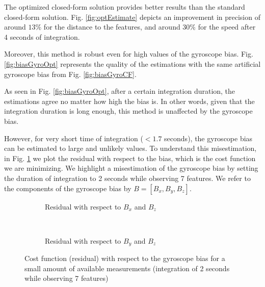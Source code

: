 \documentclass[letterpaper, 10 pt, conference]{ieeeconf}  %
\begin{document}
The optimized closed-form solution provides better results than the standard closed-form solution. Fig. \ref{fig:optEstimate} depicts an improvement in precision of around $13\%$ for the distance to the features, and around $30\%$ for the speed after 4 seconds of integration.



Moreover, this method is robust even for high values of the gyroscope bias.
Fig. \ref{fig:biasGyroOpt} represents the quality of the estimations with the same artificial gyroscope bias from Fig. \ref{fig:biasGyroCF}.



As seen in Fig. \ref{fig:biasGyroOpt}, after a certain integration duration, the estimations agree no matter how high the bias is.
In other words, given that the integration duration is long enough, this method is unaffected by the gyroscope bias.

However, for very short time of integration ($<1.7$ seconds), the gyroscope bias can be estimated to large and unlikely values.
To understand this misestimation, in Fig. \ref{fig:cost} we plot the residual with respect to the bias, which is the cost function we are minimizing.
We highlight a misestimation of the gyroscope bias by setting the duration of integration to 2 seconds while observing 7 features.
We refer to the components of the gyroscope bias by $B = [B_x, B_y, B_z]$.

\begin{figure}
        \centering
        \begin{subfigure}[b]{0.47\columnwidth}
                \resizebox{\columnwidth}{!}{}
                \caption{Residual with respect to $B_x$ and $B_z$}
        \end{subfigure}~
        \begin{subfigure}[b]{0.47\columnwidth}
                \resizebox{\columnwidth}{!}{}
                \caption{Residual with respect to $B_y$ and $B_z$}
        \end{subfigure}
        \caption{Cost function (residual) with respect to the gyroscope bias for a small amount of available measurements (integration of 2 seconds while observing 7 features)\label{fig:cost}}
\end{figure}
\end{document}
